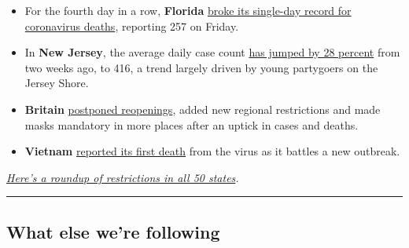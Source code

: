 \begin{itemize}
\item
  For the fourth day in a row, \textbf{Florida}
  \href{https://www.nytimes.com/2020/07/31/world/coronavirus-covid-19.html\#link-650428f9}{broke
  its single-day record for coronavirus deaths}, reporting 257 on
  Friday.
\item
  In \textbf{New Jersey}, the average daily case count
  \href{https://www.nytimes.com/2020/07/30/nyregion/coronavirus-cases-nj.html}{has
  jumped by 28 percent} from two weeks ago, to 416, a trend largely
  driven by young partygoers on the Jersey Shore.
\item
  \textbf{Britain}
  \href{https://www.nytimes.com/2020/07/31/world/coronavirus-covid-19.html\#link-20ec72b0}{postponed
  reopenings}, added new regional restrictions and made masks mandatory
  in more places after an uptick in cases and deaths.
\item
  \textbf{Vietnam}
  \href{https://www.bbc.com/news/world-asia-53606917}{reported its first
  death} from the virus as it battles a new outbreak.
\end{itemize}

\href{https://www.nytimes.com/interactive/2020/us/states-reopen-map-coronavirus.html}{\emph{Here's
a roundup of restrictions in all 50 states}}\emph{.}

\begin{center}\rule{0.5\linewidth}{\linethickness}\end{center}

\hypertarget{what-else-were-following}{%
\subsection{What else we're following}\label{what-else-were-following}}


